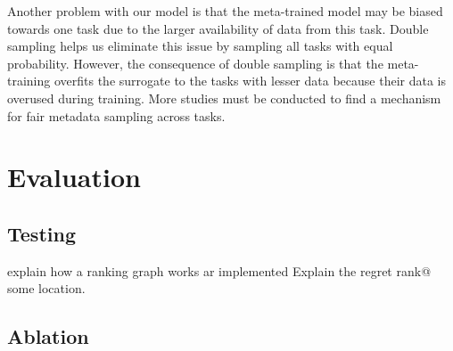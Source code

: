 \documentclass[12pt, twoside, ngerman]{report}
\begin{document}
Another problem with our model is that the meta-trained model may be biased towards one task due to the larger availability of data from this task.
Double sampling helps us eliminate this issue by sampling all tasks with equal probability.
However, the consequence of double sampling is that the meta-training overfits the surrogate to the tasks with lesser data because their data is overused during training. More studies must be conducted to find a mechanism for fair metadata sampling across tasks.

    

\iffalse
\section{Evaluation}
\subsection{Testing}
explain how a ranking graph works ar implemented
Explain the regret rank@ some location.

\subsection{Ablation}
\end{document}
